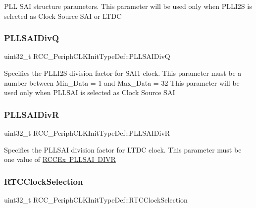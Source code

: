 P\+LL S\+AI structure parameters. This parameter will be used only when P\+L\+L\+I2S is selected as Clock Source S\+AI or L\+T\+DC \mbox{\label{struct_r_c_c___periph_c_l_k_init_type_def_a08da65a7dcf29461768f246f37531cf5}} 
\subsubsection{\texorpdfstring{PLLSAIDivQ}{PLLSAIDivQ}}
{\footnotesize\ttfamily uint32\+\_\+t R\+C\+C\+\_\+\+Periph\+C\+L\+K\+Init\+Type\+Def\+::\+P\+L\+L\+S\+A\+I\+DivQ}

Specifies the P\+L\+L\+I2S division factor for S\+A\+I1 clock. This parameter must be a number between Min\+\_\+\+Data = 1 and Max\+\_\+\+Data = 32 This parameter will be used only when P\+L\+L\+S\+AI is selected as Clock Source S\+AI \mbox{\label{struct_r_c_c___periph_c_l_k_init_type_def_aabce8358ea055ec42742106cc34ec3e0}} 
\subsubsection{\texorpdfstring{PLLSAIDivR}{PLLSAIDivR}}
{\footnotesize\ttfamily uint32\+\_\+t R\+C\+C\+\_\+\+Periph\+C\+L\+K\+Init\+Type\+Def\+::\+P\+L\+L\+S\+A\+I\+DivR}

Specifies the P\+L\+L\+S\+AI division factor for L\+T\+DC clock. This parameter must be one value of \mbox{\hyperlink{group___r_c_c_ex___p_l_l_s_a_i___d_i_v_r}{R\+C\+C\+Ex P\+L\+L\+S\+AI D\+I\+VR}} \mbox{\label{struct_r_c_c___periph_c_l_k_init_type_def_ad2c422d62b056a61d7bbb599c89dbc1e}} 
\subsubsection{\texorpdfstring{RTCClockSelection}{RTCClockSelection}}
{\footnotesize\ttfamily uint32\+\_\+t R\+C\+C\+\_\+\+Periph\+C\+L\+K\+Init\+Type\+Def\+::\+R\+T\+C\+Clock\+Selection}

